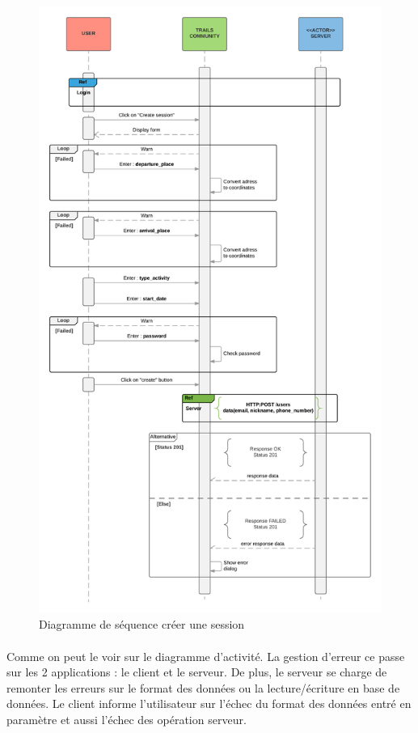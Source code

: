 \documentclass[titlepage, 12pt]{report}
\begin{document}
\begin{figure}[!h]
	\caption{Diagramme de séquence créer une session}
	\label{create_session_sequence_diagram}
	\centering
	\includegraphics[scale=0.5]{Images/diagram/create_session_sequence_diagram.png}
\end{figure}

\paragraph{}Comme on peut le voir sur le diagramme d'activité. La gestion d'erreur ce passe sur les 2 applications : le client et le serveur. De plus, le serveur se charge de remonter les erreurs sur le format des données ou la lecture/écriture en base de données. Le client informe l'utilisateur sur l'échec du format des données entré en paramètre et aussi l'échec des opération serveur.
\end{document}
